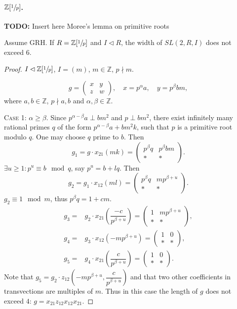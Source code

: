 \paragraph{$\mathbb{Z}[\sfrac{1}{p}]$.}
\textbf{TODO:} Insert here Moree's lemma on primitive roots
\begin{lemma}\label{lemma:Z1p}
Assume GRH. If $R=\mathbb{Z}[\sfrac{1}{p}]$ and $I\lhd R$, the width of $SL(2,R,I)$ does not exceed $6$.
\end{lemma}
\begin{proof}
$I\lhd\mathbb{Z}[\sfrac{1}{p}]$, $I=(m)$, $m\in\mathbb{Z}$, $p\nmid m$.

\[ g=\begin{pmatrix}
x & y \\ z & w
\end{pmatrix},\quad x =p^\alpha a,\quad y =p^\beta bm, \]
where $a,b\in\mathbb{Z}$, $p\nmid a,b$ and $\alpha,\beta\in\mathbb{Z}$.

\textsc{Case 1:} $\alpha\geqslant\beta$. Since $p^{\alpha-\beta}a\perp bm^2$ and $p\perp bm^2$, there exist infinitely many rational primes $q$ of the form $p^{\alpha-\beta}a+bm^2k$, such that $p$ is a primitive root modulo $q$. One may choose $q$ prime to $b$. Then
\[ g_1=g\cdot x_{21}(mk) =
\begin{pmatrix} p^\beta q & p^\beta bm \\ * & * \end{pmatrix}.\]
$\exists u\geqslant 1: p^u\equiv b\mod q$, say $p^u=b+lq$. Then
\[ g_2 = g_1\cdot x_{12}(ml) =
\begin{pmatrix} p^\beta q & mp^{\beta+u} \\ * & * \end{pmatrix}. \]
$g_2\equiv 1\mod m$, thus $p^\beta q=1+cm$.
\begin{align*}
g_3 = & g_2\cdot x_{21}\left(\dfrac{-c}{p^{\beta+u}}\right) =
\begin{pmatrix} 1 & mp^{\beta+u} \\ * & * \end{pmatrix}, \\
g_4 = & g_3\cdot x_{12}(-mp^{\beta+u}) =
\begin{pmatrix} 1 & 0 \\ * & * \end{pmatrix}, \\
g_5 = & g_4\cdot x_{21}\left(\dfrac{c}{p^{\beta+u}}\right) =
\begin{pmatrix} 1 & 0 \\ * & * \end{pmatrix}.
\end{align*}
Note that $g_5=g_2\cdot z_{12}\left(-mp^{\beta+u},\dfrac{c}{p^{\beta+u}}\right)$ and that two other coefficients in transvections are multiples of $m$. Thus in this case the length of $g$ does not exceed $4$: $g=x_{21}z_{12}x_{12}x_{21}$.


\end{proof}
